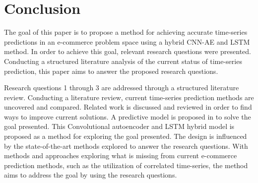\section{Conclusion}
\label{section:Discussion:Clonclusion}


The goal of this paper is to propose a method for achieving accurate time-series predictions in an e-commerce
problem space using a hybrid CNN-AE and LSTM method.
In order to achieve this goal, relevant research questions were presented.
Conducting a structured literature analysis of the current status of time-series prediction,
this paper aims to answer the proposed research questions.

Research questions 1 through 3 are addressed through a structured literature review.
Conducting a literature review, current time-series prediction methods are uncovered and compared.
Related work is discussed and reviewed in order to find ways to improve current solutions.
A predictive model is proposed in  to solve the goal presented.
This Convolutional autoencoder and LSTM hybrid model is proposed as a method for exploring the goal presented.
The design is influenced by the state-of-the-art methods explored to answer the research questions.
With methods and approaches exploring what is missing from current e-commerce prediction methods,
such as the utilization of correlated time-series, the method aims to address the goal by using the research questions.


